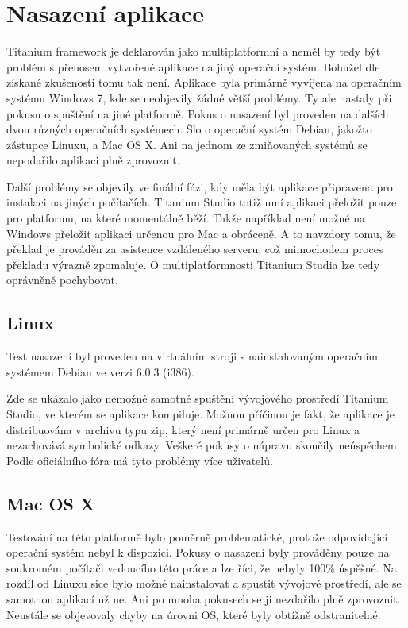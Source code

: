 \chapter{Nasazení aplikace}

Titanium framework je deklarován jako multiplatformní a neměl by tedy být problém s přenosem vytvořené aplikace na jiný operační systém. Bohužel dle získané zkušenosti tomu tak není. Aplikace byla primárně vyvíjena na operačním systému Windows 7, kde se neobjevily žádné větší problémy. Ty ale nastaly při pokusu o spuštění na jiné platformě. Pokus o nasazení byl proveden na dalších dvou různých operačních systémech. Šlo o operační systém Debian\cite{debian}, jakožto zástupce Linuxu, a Mac OS X\cite{mac}. Ani na jednom ze zmiňovaných systémů se nepodařilo aplikaci plně zprovoznit.

Další problémy se objevily ve finální fázi, kdy měla být aplikace připravena pro instalaci na jiných počítačích. Titanium Studio totiž umí aplikaci přeložit pouze pro platformu, na které momentálně běží. Takže například není možné na Windows přeložit aplikaci určenou pro Mac a obráceně. A to navzdory tomu, že překlad je prováděn za asistence vzdáleného serveru, což mimochodem proces překladu výrazně zpomaluje. O multiplatformnosti Titanium Studia lze tedy oprávněně pochybovat.

\section{Linux}
Test nasazení byl proveden na virtuálním stroji s nainstalovaným operačním systémem Debian ve verzi 6.0.3 (i386).

Zde se ukázalo jako nemožné samotné spuštění vývojového prostředí Titanium Studio, ve kterém se aplikace kompiluje. Možnou příčinou je fakt, že aplikace je distribuována v archivu typu zip, který není primárně určen pro Linux a nezachovává symbolické odkazy. Veškeré pokusy o nápravu skončily neúspěchem. Podle oficiálního fóra má tyto problémy více uživatelů.

\section{Mac OS X}

Testování na této platformě bylo poměrně problematické, protože odpovídající operační systém nebyl k dispozici. Pokusy o nasazení byly prováděny pouze na soukromém počítači vedoucího této práce a lze říci, že nebyly 100\% úspěšné. Na rozdíl od Linuxu sice bylo možné nainstalovat a spustit vývojové prostředí, ale se samotnou aplikací už ne. Ani po mnoha pokusech se ji nezdařilo plně zprovoznit. Neustále se objevovaly chyby na úrovni OS, které byly obtížně odstranitelné.
